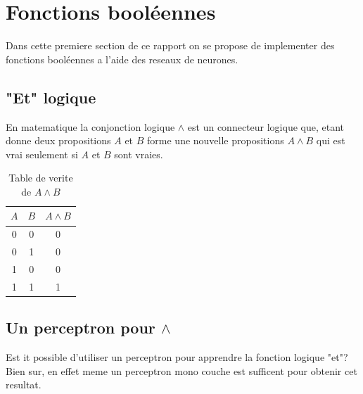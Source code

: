 \documentclass[twoside,openright,a4paper,11pt,french]{article}
\begin{document}
\pagestyle{plain}
\setlength{\parindent}{0pt}



\parskip=0pt
\tableofcontents


\vspace{5cm}


\section{Fonctions booléennes}

Dans cette premiere section de ce rapport on se propose
de implementer des fonctions booléennes a l'aide des reseaux
de neurones. 

\subsection{"Et" logique}

En matematique la conjonction logique $\land$ est un
connecteur logique que, etant donne deux propositions $A$ et $B$
forme une nouvelle propositions $A \land B$ qui est vrai seulement
si $A$ et $B$ sont vraies.

\begin{table}[h]
  \centering
  \begin{tabular}{| c | c | c |}
    \hline
    \textbf{$A$} & \textbf{$B$} & \textbf{$A \land B$}\\
    \hline
    0 & 0  & 0 \\
    \hline
    0 & 1  & 0 \\
    \hline
    1 & 0  & 0 \\
    \hline
    1 & 1  & 1 \\
    \hline
  \end{tabular}
  \caption{Table de verite de $A \land B$}
  \label{tab:et}
\end{table}




\subsection{Un perceptron pour $\land$} 

Est it possible d'utiliser un perceptron pour apprendre la fonction logique
"et"? Bien sur, en effet meme un perceptron mono couche est sufficent pour
obtenir cet resultat.\\
\end{document}
